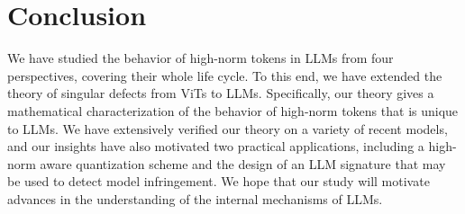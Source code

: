 \section{Conclusion}\label{sec:conclusion}

We have studied the behavior of high-norm tokens in LLMs from four perspectives, covering their whole life cycle.
To this end, we have extended the theory of singular defects from ViTs to LLMs.
Specifically, our theory gives a mathematical characterization of the behavior of high-norm tokens that is unique to LLMs.
We have extensively verified our theory on a variety of recent models, and our insights have also motivated two practical applications, including a high-norm aware quantization scheme and the design of an LLM signature that may be used to detect model infringement.
We hope that our study will motivate advances in the understanding of the internal mechanisms of LLMs.

